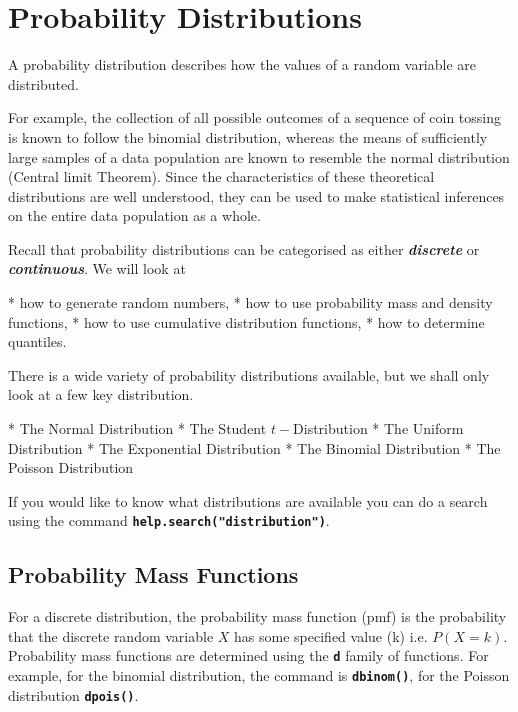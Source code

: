 

\section{Probability Distributions}
A probability distribution describes how the values of a random variable are distributed. 

For example, the collection of all possible outcomes of a sequence of coin tossing is known to follow the binomial distribution, whereas the means of sufficiently large samples of a data population are known to resemble the normal distribution (Central limit Theorem). Since the characteristics of these theoretical distributions are well understood, they can be used to make statistical inferences on the entire data population as a whole.

Recall that probability distributions can be categorised as either \textit{\textbf{discrete}} or \textit{\textbf{continuous}}.
We will look at  
\begin{itemize}
*  how to generate random numbers,
*  how to use probability mass and density functions,
*  how to use cumulative distribution functions,
*  how to determine quantiles.
\end{itemize} 

There is a wide variety of probability distributions available, but we shall only look at a few key distribution. 

\begin{itemize}
* 	The Normal Distribution
* 	The Student $t-$Distribution
*    The Uniform Distribution
* 	The Exponential Distribution
* 	The Binomial Distribution
* 	The Poisson Distribution
\end{itemize}

If you would like to know what distributions are available you can do a search using the command \texttt{\textbf{help.search("distribution")}}. 



\subsection{Probability Mass Functions} 

For a discrete distribution, the probability mass function (pmf) is the probability that the discrete random variable $X$ has some specified value (k) i.e. $P(X = k)$. Probability mass functions are determined using the \texttt{\textbf{d}} family of functions. For example, for the binomial distribution, the command is \texttt{\textbf{dbinom()}}, for the Poisson distribution \texttt{\textbf{dpois()}}. 


